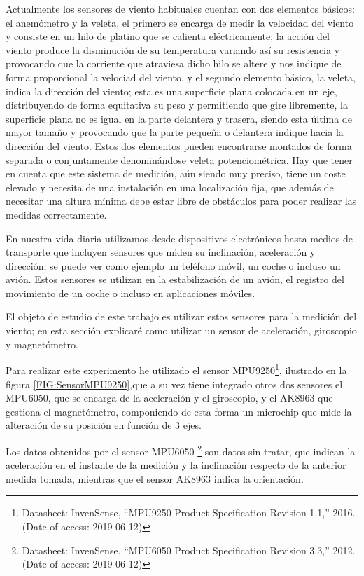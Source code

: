 
 Actualmente los sensores de viento habituales cuentan con dos elementos básicos: el anemómetro y la veleta, el primero se encarga de medir la velocidad del viento y consiste en un hilo de platino que se calienta eléctricamente; la acción del viento produce la disminución de su temperatura variando así su resistencia y provocando que la corriente que atraviesa dicho hilo se altere y nos indique de forma proporcional la velociad del viento\cite{Tropea1995}, y el segundo elemento básico, la veleta, indica la dirección del viento; esta es una superficie plana colocada en un eje, distribuyendo de forma equitativa su peso y permitiendo que gire libremente, la superficie plana no es igual en la parte delantera y trasera, siendo esta última de mayor tamaño y  provocando que la parte pequeña o delantera indique hacia la dirección del viento\cite{Noble2019}. Estos dos elementos pueden encontrarse montados de forma separada o conjuntamente denominándose veleta potenciométrica\cite{Mur2012}.
 Hay que tener en cuenta que este sistema de medición, aún siendo muy preciso, tiene un coste elevado y necesita de una instalación en una localización fija, que además de necesitar una altura mínima debe estar libre de obstáculos para poder realizar las medidas correctamente.
 
 En nuestra vida diaria utilizamos desde dispositivos electrónicos hasta medios de transporte que incluyen sensores que miden su inclinación, aceleración y dirección, se puede ver como ejemplo un teléfono móvil, un coche o incluso un avión.
 Estos sensores se utilizan en la estabilización de un avión, el registro del movimiento de un coche o incluso en aplicaciones móviles.
 
 El objeto de estudio de este trabajo es utilizar estos sensores para la medición del viento; en esta sección explicaré como utilizar un sensor de aceleración, giroscopio y magnetómetro.
 
 Para realizar este experimento he utilizado el sensor MPU9250\footnote{Datasheet: InvenSense, ``{MPU9250 Product Specification Revision 1.1},'' 2016. (Date of access: 2019-06-12)}, ilustrado en la figura \ref{FIG:SensorMPU9250},que a su vez tiene integrado otros dos sensores el MPU6050, que se encarga de la aceleración y el giroscopio, y el AK8963 que gestiona el magnetómetro, componiendo de esta forma un microchip que mide la alteración de su posición en función de 3 ejes.
 
 Los datos obtenidos por el sensor MPU6050 \footnote{Datasheet: InvenSense, ``{MPU6050 Product Specification Revision 3.3},'' 2012. (Date of access: 2019-06-12)} son datos sin tratar, que indican la aceleración en el instante de la medición y la inclinación respecto de la anterior medida tomada, mientras que el sensor AK8963 indica la orientación.
 
